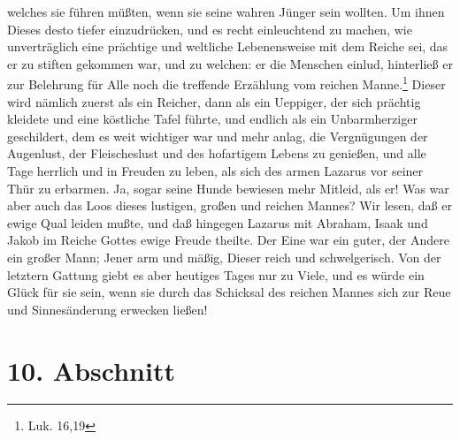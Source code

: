 welches sie führen müßten, wenn sie seine wahren Jünger sein wollten. Um ihnen
Dieses desto tiefer einzudrücken, und es recht einleuchtend zu machen, wie
unverträglich eine prächtige und weltliche Lebenensweise mit dem Reiche sei, das
er zu stiften gekommen war, und zu welchen: er die Menschen einlud, hinterließ
er zur Belehrung für Alle noch die treffende Erzählung vom reichen
Manne.\footnote{Luk. 16,19} Dieser wird nämlich zuerst als ein Reicher, dann als
ein Ueppiger, der sich prächtig kleidete und eine köstliche Tafel führte, und
endlich als ein Unbarmherziger geschildert, dem es weit wichtiger war und mehr
anlag, die Vergnügungen der Augenlust, der Fleischeslust und des hofartigem
Lebens zu genießen, und alle Tage herrlich und in Freuden zu leben, als sich des
armen Lazarus vor seiner Thür zu erbarmen. Ja, sogar seine Hunde bewiesen mehr
Mitleid, als er! Was war aber auch das Loos dieses lustigen, großen und reichen
Mannes? Wir lesen, daß er ewige Qual leiden mußte, und daß hingegen Lazarus mit
Abraham, Isaak und Jakob im Reiche Gottes ewige Freude theilte. Der Eine war ein
guter, der Andere ein großer Mann; Jener arm und mäßig, Dieser reich und
schwelgerisch. Von der letztern Gattung giebt es aber heutiges Tages nur zu
Viele, und es würde ein Glück für sie sein, wenn sie durch das Schicksal des
reichen Mannes sich zur Reue und Sinnesänderung erwecken ließen!

\section{10. Abschnitt} \label{kap14_ab10}

